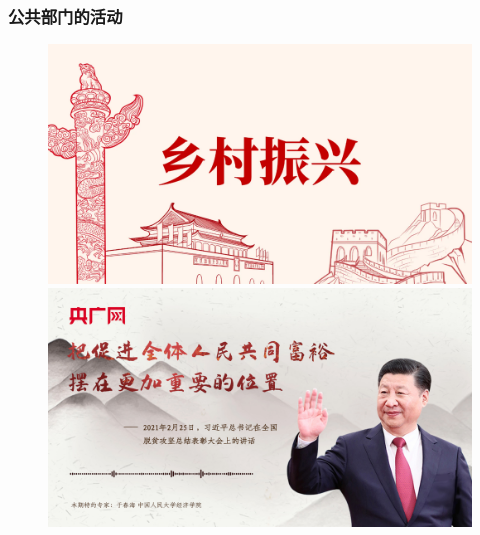 \documentclass[aspectratio=169, 12pt]{beamer}
\begin{document}
\begin{frame}[plain]
    \frametitle{公共部门的活动}
    \begin{figure}
        \centering
        \begin{minipage}[t]{0.5\linewidth}
            \centering
            \includegraphics[width=1.0\textwidth]{./resources/figure/ct.png}
        \end{minipage}%
        \begin{minipage}[t]{0.5\linewidth}
            \centering
            \includegraphics[width=1.0\textwidth]{./resources/figure/wealth.jpg}
        \end{minipage}
    \end{figure}
\end{frame}
\end{document}
